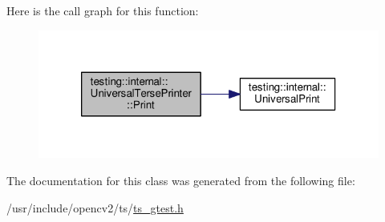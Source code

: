 Here is the call graph for this function\-:\nopagebreak
\begin{figure}[H]
\begin{center}
\leavevmode
\includegraphics[width=318pt]{classtesting_1_1internal_1_1UniversalTersePrinter_a2e16ee42c9b18fca397cd95f32e8e879_cgraph}
\end{center}
\end{figure}




The documentation for this class was generated from the following file\-:\begin{DoxyCompactItemize}
\item 
/usr/include/opencv2/ts/\hyperlink{ts__gtest_8h}{ts\-\_\-gtest.\-h}\end{DoxyCompactItemize}
